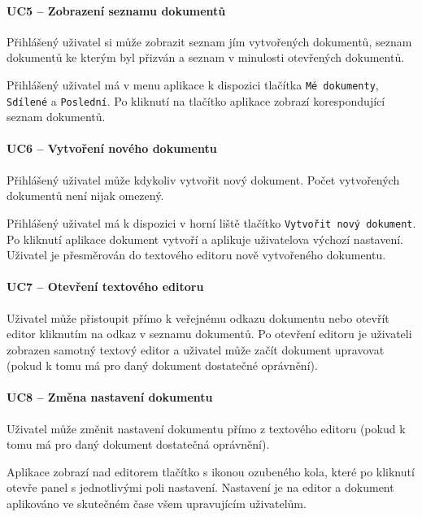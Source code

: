 \paragraph{UC5 -- Zobrazení seznamu dokumentů}

Přihlášený uživatel si může zobrazit seznam jím vytvořených dokumentů, seznam dokumentů ke kterým byl přizván a seznam v minulosti otevřených dokumentů.

Přihlášený uživatel má v menu aplikace k dispozici tlačítka \texttt{Mé dokumenty}, \texttt{Sdílené} a \texttt{Poslední}.
Po kliknutí na tlačítko aplikace zobrazí korespondující seznam dokumentů.

\paragraph{UC6 -- Vytvoření nového dokumentu}

Přihlášený uživatel může kdykoliv vytvořit nový dokument.
Počet vytvořených dokumentů není nijak omezený.

Přihlášený uživatel má k dispozici v horní liště tlačítko \texttt{Vytvořit nový dokument}.
Po kliknutí aplikace dokument vytvoří a aplikuje uživatelova výchozí nastavení.
Uživatel je přesměrován do textového editoru nově vytvořeného dokumentu.

\paragraph{UC7 -- Otevření textového editoru}

Uživatel může přistoupit přímo k veřejnému odkazu dokumentu nebo otevřít editor kliknutím na odkaz v seznamu dokumentů.
Po otevření editoru je uživateli zobrazen samotný textový editor a uživatel může začít dokument upravovat (pokud k tomu má pro daný dokument dostatečné oprávnění).

\paragraph{UC8 -- Změna nastavení dokumentu}

Uživatel může změnit nastavení dokumentu přímo z textového editoru (pokud k tomu má pro daný dokument dostatečná oprávnění).

Aplikace zobrazí nad editorem tlačítko s ikonou ozubeného kola, které po kliknutí otevře panel s jednotlivými poli nastavení.
Nastavení je na editor a dokument aplikováno ve skutečném čase všem upravujícím uživatelům.


